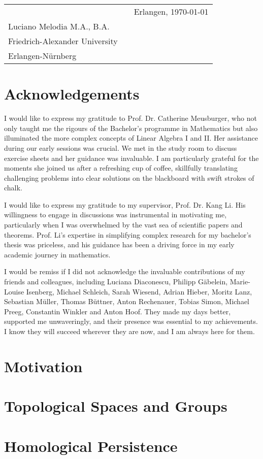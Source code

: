 \documentclass[b5paper, 11pt, twoside]{report}
\begin{document}
\vspace{2cm}
\begin{tabular}{@{}p{3.5in}p{2in}p{2in}@{}}
	\hrulefill                 &   & Erlangen, \today \\
	Luciano Melodia M.A., B.A. &   &                  \\
	Friedrich-Alexander University \\
	Erlangen-Nürnberg
\end{tabular}

\chapter*{Acknowledgements}
I would like to express my gratitude to Prof. Dr. Catherine Meusburger, who not only taught me the rigours of the Bachelor's programme in Mathematics but also illuminated the more complex concepts of Linear Algebra I and II. Her assistance during our early sessions was crucial. We met in the study room to discuss exercise sheets and her guidance was invaluable. I am particularly grateful for the moments she joined us after a refreshing cup of coffee, skillfully translating challenging problems into clear solutions on the blackboard with swift strokes of chalk.

I would like to express my gratitude to my supervisor, Prof. Dr. Kang Li. His willingness to engage in discussions was instrumental in motivating me, particularly when I was overwhelmed by the vast sea of scientific papers and theorems. Prof. Li's expertise in simplifying complex research for my bachelor's thesis was priceless, and his guidance has been a driving force in my early academic journey in mathematics.

I would be remiss if I did not acknowledge the invaluable contributions of my friends and colleagues, including Luciana Diaconescu, Philipp Gäbelein, Marie-Louise Isenberg, Michael Schleich, Sarah Wiesend, Adrian Hieber, Moritz Lanz, Sebastian Müller, Thomas Büttner, Anton Rechenauer, Tobias Simon, Michael Preeg, Constantin Winkler and Anton Hoof. They made my days better, supported me unwaveringly, and their presence was essential to my achievements. I know they will succeed wherever they are now, and I am always here for them.

\newpage
\tableofcontents

\singlespacing
\chapter{Motivation}


\chapter{Topological Spaces and Groups}


\chapter{Homological Persistence}


\singlespacing
\printbibliography

\newpage
\printindex
\end{document}
